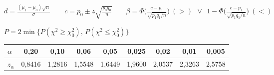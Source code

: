 \documentclass[10pt,a4paper]{extarticle}
\newcommand{\sq}[1]{\sqrt{#1}}
\newcommand{\fm}[1]{\par\noindent$\displaystyle #1$\par\vspace{2.5pt}}
\begin{document}
\vspace{4pt}
\fm{d=\frac{(\mu_1-\mu_0)\sq n}{\sigma}\qquad c=p_0\pm z\sq{\frac{p_0q_0}{n}}\qquad \beta=\Phi\Big(\frac{c-p_1}{\sq{p_1q_1/n}}\Big)\ (>)\ \ \vee\ \ 1-\Phi\Big(\frac{c-p_1}{\sq{p_1q_1/n}}\Big)\ (<)}
\fm{P=2\min\{P(\chi^2\ge\chi_0^2),\,P(\chi^2\le\chi_0^2)\}}

\renewcommand{\arraystretch}{1.25}
\noindent\begin{tabular}{@{}lcccccccc@{}}
$\alpha$ & 0,20 & 0,10 & 0,06 & 0,05 & 0,025 & 0,02 & 0,01 & 0,005\\\midrule
$z_\alpha$ & 0,8416 & 1,2816 & 1,5548 & 1,6449 & 1,9600 & 2,0537 & 2,3263 & 2,5758\\
\end{tabular}
\end{document}
